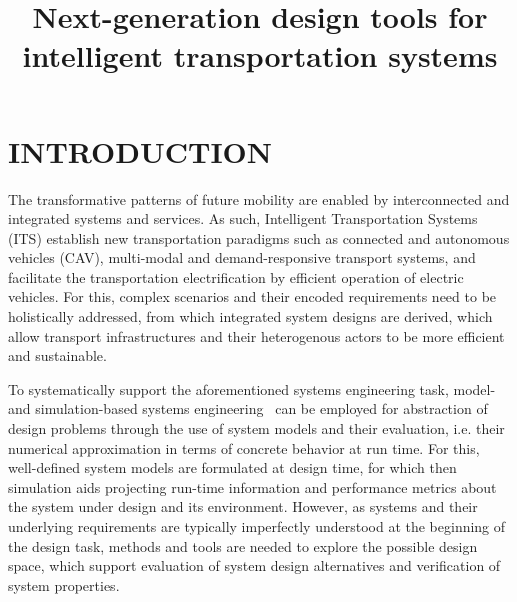 \documentclass[a4paper,twoside]{article}
\begin{document}
	
	\title{Next-generation design tools for intelligent transportation systems}
	
	\author{
	}
	
	
	
	\onecolumn \maketitle \normalsize \setcounter{footnote}{0} \vfill
	
	\section{\uppercase{Introduction}}
	\label{sec:introduction}
	
	The transformative patterns of future mobility are enabled by interconnected and integrated systems and services.
	As such, Intelligent Transportation Systems (ITS) establish new transportation paradigms such as connected and autonomous vehicles (CAV), multi-modal and demand-responsive transport systems, and facilitate the transportation electrification by efficient operation of electric vehicles. For this, complex scenarios and their encoded requirements need to be holistically addressed, from which integrated system designs are derived, which allow transport infrastructures and their heterogenous actors to be more efficient and sustainable.
	
	To systematically support the aforementioned systems engineering task, model- and simulation-based systems engineering~\cite{gianni2014modeling} can be employed for abstraction of design problems through the use of system models and their evaluation, i.e. their numerical approximation in terms of concrete behavior at run time. For this, well-defined system models are formulated at design time, for which then simulation aids projecting run-time information and performance metrics about the system under design and its environment. 
	However, as systems and their underlying requirements are typically imperfectly understood at the beginning of the design task, methods and tools are needed to explore the possible design space, which support evaluation of system design alternatives and verification of system properties. 
	
\end{document}
